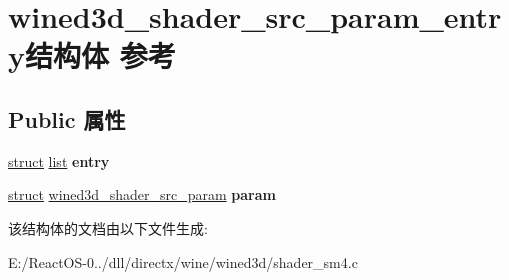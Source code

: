 \hypertarget{structwined3d__shader__src__param__entry}{}\section{wined3d\+\_\+shader\+\_\+src\+\_\+param\+\_\+entry结构体 参考}
\label{structwined3d__shader__src__param__entry}
\subsection*{Public 属性}
\begin{DoxyCompactItemize}
\item 
\mbox{\label{structwined3d__shader__src__param__entry_afc79bf59fb8fd37c9bbe9a6a5f66f6cb}} 
\hyperlink{interfacestruct}{struct} \hyperlink{classlist}{list} {\bfseries entry}
\item 
\mbox{\label{structwined3d__shader__src__param__entry_a1e3eb88ae66efbc8d7d5a056f200a28e}} 
\hyperlink{interfacestruct}{struct} \hyperlink{structwined3d__shader__src__param}{wined3d\+\_\+shader\+\_\+src\+\_\+param} {\bfseries param}
\end{DoxyCompactItemize}


该结构体的文档由以下文件生成\+:\begin{DoxyCompactItemize}
\item 
E\+:/\+React\+O\+S-\/0../dll/directx/wine/wined3d/shader\+\_\+sm4.\+c\end{DoxyCompactItemize}
